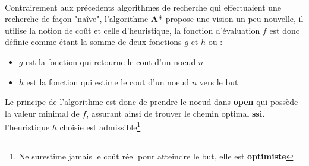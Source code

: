 \paragraph{}
Contrairement aux précedents algorithmes de recherche qui effectuaient une recherche de façon "naîve", l'algorithme \textbf{A* }propose une vision un peu nouvelle, il utilise la notion de coût et celle d'heuristique, la fonction d'évaluation $f$ est donc définie comme étant la somme de deux fonctions $g$ et $h$ ou : \\
	\begin{itemize}
		\item $g$ est la fonction  qui retourne le cout d'un noeud $n$
		\item $h$ est la fonction  qui estime le cout d'un noeud $n$ vers le but
	\end{itemize} 
Le principe de l'algorithme est donc de prendre le noeud dans \textbf{open} qui possède la valeur minimal de $f$, assurant ainsi de trouver le chemin optimal \textbf{ssi.} l'heuristique $h$ choisie est admissible\footnote[2]{Ne surestime jamais le coût réel pour atteindre le but, elle est \textbf{optimiste}}

